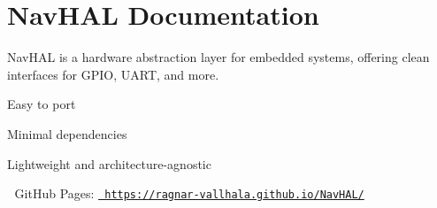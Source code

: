 \chapter{Nav\+HAL Documentation}
\hypertarget{index}{}\label{index}
Nav\+HAL is a hardware abstraction layer for embedded systems, offering clean interfaces for GPIO, UART, and more.


\begin{DoxyItemize}
\item Easy to port
\item Minimal dependencies
\item Lightweight and architecture-\/agnostic
\end{DoxyItemize}

📘 Git\+Hub Pages\+: \href{https://ragnar-vallhala.github.io/NavHAL/}{\texttt{ https\+://ragnar-\/vallhala.\+github.\+io/\+Nav\+HAL/}} 